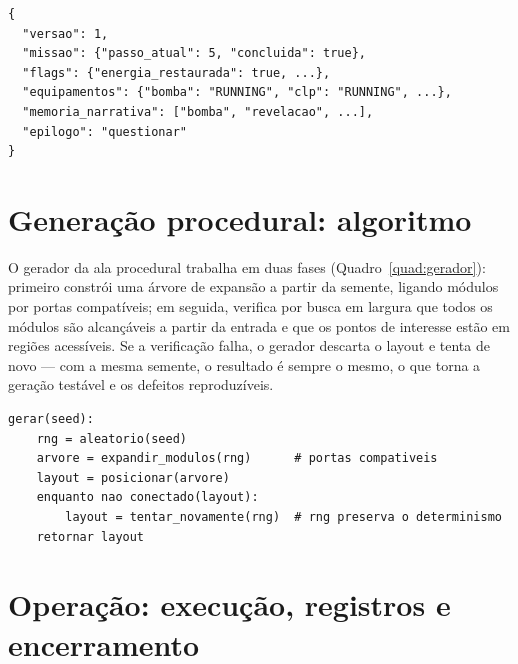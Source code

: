 \begin{quadro}[htbp]
\centering
\caption{Estrutura do arquivo de salvamento (campos principais).}
\label{quad:save}
\begin{verbatim}
{
  "versao": 1,
  "missao": {"passo_atual": 5, "concluida": true},
  "flags": {"energia_restaurada": true, ...},
  "equipamentos": {"bomba": "RUNNING", "clp": "RUNNING", ...},
  "memoria_narrativa": ["bomba", "revelacao", ...],
  "epilogo": "questionar"
}
\end{verbatim}
\par\vspace{2pt}{\footnotesize Fonte: elaborado pelo autor (2026), a partir do sistema de salvamento do projeto.}
\end{quadro}

\section{Generação procedural: algoritmo}
\label{sec:algoritmo_gerador}

O gerador da ala procedural trabalha em duas fases (Quadro~\ref{quad:gerador}):
primeiro constrói uma árvore de expansão a partir da semente, ligando módulos
por portas compatíveis; em seguida, verifica por busca em largura que todos os
módulos são alcançáveis a partir da entrada e que os pontos de interesse
estão em regiões acessíveis. Se a verificação falha, o gerador descarta o
layout e tenta de novo --- com a mesma semente, o resultado é sempre o mesmo,
o que torna a geração testável e os defeitos reproduzíveis.

\begin{quadro}[htbp]
\centering
\caption{Pseudocódigo do gerador procedural (duas fases).}
\label{quad:gerador}
\begin{verbatim}
gerar(seed):
    rng = aleatorio(seed)
    arvore = expandir_modulos(rng)      # portas compativeis
    layout = posicionar(arvore)
    enquanto nao conectado(layout):
        layout = tentar_novamente(rng)  # rng preserva o determinismo
    retornar layout
\end{verbatim}
\par\vspace{2pt}{\footnotesize Fonte: elaborado pelo autor (2026), a partir do gerador do projeto.}
\end{quadro}

\section{Operação: execução, registros e encerramento}
\label{sec:operacao}

